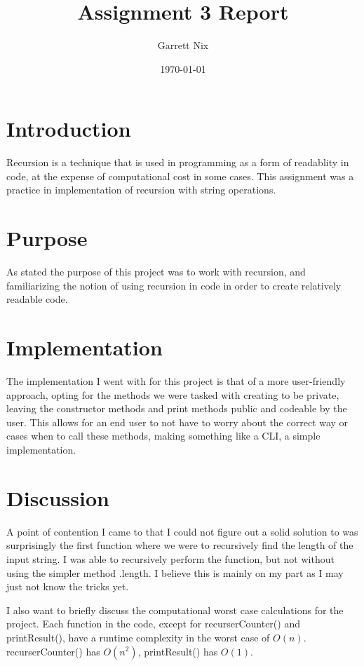 \documentclass[11pt]{article}
\title{Assignment 3 Report}
\author{Garrett Nix}
\date{\today}
\theoremstyle{definition}
\begin{document}
\maketitle
\vspace{-2em}  %
\section{Introduction}
Recursion is a technique that is used in programming as a form of readablity in code, at the expense of computational cost in some cases. This assignment was a practice in implementation of recursion with string operations.
\section{Purpose}
As stated the purpose of this project was to work with recursion, and familiarizing the notion of using recursion in code in order to create relatively readable code.
\section{Implementation}
The implementation I went with for this project is that of a more user-friendly approach, opting for the methods we were tasked with creating to be private, leaving the constructor methods and print methods public and codeable by the user. This allows for an end user to not have to worry about the correct way or cases when to call these methods, making something like a CLI, a simple implementation.
\section{Discussion}
A point of contention I came to that I could not figure out a solid solution to was surprisingly the first function where we were to recursively find the length of the input string. I was able to recursively perform the function, but not without using the simpler method .length. I believe this is mainly on my part as I may just not know the tricks yet. 

I also want to briefly discuss the computational worst case calculations for the project. Each function in the code, except for recurserCounter() and printResult(), have a runtime complexity in the worst case of $O(n)$. recurserCounter() has $O(n^2)$, printResult() has $O(1)$.
\end{document}
